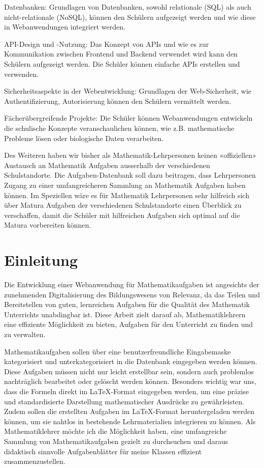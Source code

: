 \documentclass[12pt,a4paper]{article} %
\begin{document}
Datenbanken: Grundlagen von Datenbanken, sowohl relationale (SQL) als auch nicht-relationale (NoSQL), können den Schülern aufgezeigt werden und wie diese in Webanwendungen integriert werden.

API-Design und -Nutzung: Das Konzept von APIs und wie es zur Kommunikation zwischen Frontend und Backend verwendet wird kann den Schülern aufgezeigt werden. Die Schüler können einfache APIs erstellen und verwenden.

Sicherheitsaspekte in der Webentwicklung: Grundlagen der Web-Sicherheit, wie Authentifizierung, Autorisierung können den Schülern vermittelt werden.

Fächerübergreifende Projekte: Die Schüler können Webanwendungen entwickeln die schulische Konzepte veranschaulichen können, wie z.B. mathematische Probleme lösen oder biologische Daten verarbeiten.

Des Weiteren haben wir bisher als Mathematik-Lehrpersonen keinen «offiziellen» Austausch an Mathematik Aufgaben ausserhalb der verschiedenen Schulstandorte. Die Aufgaben-Datenbank soll dazu beitragen, dass Lehrpersonen Zugang zu einer umfangreicheren Sammlung an Mathematik Aufgaben haben können. Im Speziellen wäre es für Mathematik Lehrpersonen sehr hilfreich sich über Matura Aufgaben der verschiedenen Schulstandorte einen Überblick zu verschaffen, damit die Schüler mit hilfreichen Aufgaben sich optimal auf die Matura vorbereiten können.



\section{Einleitung}
Die Entwicklung einer Webanwendung für Mathematikaufgaben ist angesichts der zunehmenden Digitalisierung des Bildungswesens von Relevanz, da das Teilen und Bereitstellen von guten, lernreichen Aufgaben für die Qualität des Mathematik Unterrichts unabdingbar ist. Diese Arbeit zielt darauf ab, Mathematiklehrern eine effiziente Möglichkeit zu bieten, Aufgaben für den Unterricht zu finden und zu verwalten.


Mathematikaufgaben sollen über eine benutzerfreundliche Eingabemaske kategorisiert und unterkategorisiert in die Datenbank eingegeben werden können. Diese Aufgaben müssen nicht nur leicht erstellbar sein, sondern auch problemlos nachträglich bearbeitet oder gelöscht werden können. Besonders wichtig war uns, dass die Formeln direkt im LaTeX-Format eingegeben werden, um eine präzise und standardisierte Darstellung mathematischer Ausdrücke zu gewährleisten. Zudem sollen die erstellten Aufgaben im LaTeX-Format heruntergeladen werden können, um sie nahtlos in bestehende Lehrmaterialien integrieren zu können. Als Mathematiklehrer möchte ich die Möglichkeit haben, eine umfangreiche Sammlung von Mathematikaufgaben gezielt zu durchsuchen und daraus didaktisch sinnvolle Aufgabenblätter für meine Klassen effizient zusammenzustellen.
\end{document}
